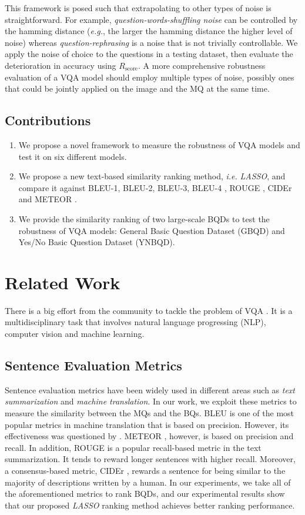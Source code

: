 \documentclass[letterpaper]{article}
\newcommand{\ie}{}\def\ie/{{\em i.e.}}
\newcommand{\eg}{}\def\eg/{{\em e.g.}}
\newcommand{\lasso}{}\def\lasso/{\textit{LASSO}}
\newcommand{\rscore}{}\def\rscore/{$R_{\text{score}}$}
\begin{document}
This framework is posed such that extrapolating to other types of noise is straightforward. For example, \emph{question-words-shuffling noise} can be controlled by the hamming distance (\eg/, the larger the hamming distance the higher level of noise) whereas \emph{question-rephrasing} is a noise that is not trivially controllable. We apply the noise of choice to the questions in a testing dataset, then evaluate the deterioration in accuracy using \rscore/. A more comprehensive robustness evaluation of a VQA model should employ multiple types of noise, possibly ones that could be jointly applied on the image and the MQ at the same time.

\subsection{Contributions}
\begin{enumerate}[i]
	\item We propose a novel framework to measure the robustness of VQA models and test it on six different models.
	\item We propose a new text-based similarity ranking method, \ie/ \lasso/, and compare it against BLEU-1, BLEU-2, BLEU-3, BLEU-4 \cite{49}, ROUGE \cite{68}, CIDEr \cite{67} and METEOR \cite{69}.
	\item We provide the similarity ranking of two large-scale BQDs to test the robustness of VQA models: General Basic Question Dataset (GBQD) and Yes/No Basic Question Dataset (YNBQD).
\end{enumerate}

\section{Related Work}
There is a big effort from the community to tackle the problem of VQA \cite{26,33,54,65,66}. It is a multidisciplinary task that involves natural language progressing (NLP), computer vision and machine learning.

\subsection{Sentence Evaluation Metrics}
Sentence evaluation metrics have been widely used in different areas such as \emph{text summarization} and \emph{machine translation}. In our work, we exploit these metrics to measure the similarity between the MQs and the BQs. BLEU \cite{49} is one of the most popular metrics in machine translation that is based on precision. However, its effectiveness was questioned by \cite{70,71}. METEOR \cite{69}, however, is based on precision and recall. In addition, ROUGE \cite{68} is a popular recall-based metric in the text summarization. It tends to reward longer sentences with higher recall. Moreover, a consensus-based metric, CIDEr \cite{67}, rewards a sentence for being similar to the majority of descriptions written by a human. In our experiments, we take all of the aforementioned metrics to rank BQDs, and our experimental results show that our proposed \lasso/ ranking method achieves better ranking performance.
\end{document}
